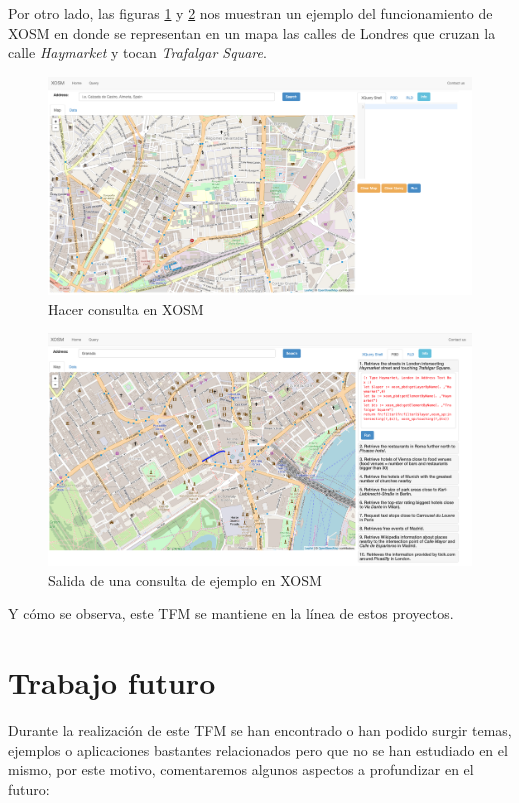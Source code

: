Por otro lado, las figuras \ref{fig:2-6} y \ref{fig:3-6} nos muestran un ejemplo del funcionamiento de XOSM en donde se representan en un mapa las calles de Londres que cruzan la calle \textit{Haymarket} y tocan \textit{Trafalgar Square}.

\begin{figure}[H]
	\centering
	\includegraphics[width=1\linewidth]{imagenes/capitulo6/2}
	\caption{Hacer consulta en XOSM}
	\label{fig:2-6}
\end{figure}

\begin{figure}[H]
	\centering
	\includegraphics[width=1\linewidth]{imagenes/capitulo6/3}
	\caption{Salida de una consulta de ejemplo en XOSM}
	\label{fig:3-6}
\end{figure}


Y cómo se observa, este TFM se mantiene en la línea de estos proyectos.

\section{Trabajo futuro}

Durante la realización de este TFM se han encontrado o han podido surgir temas, ejemplos o aplicaciones bastantes relacionados pero que no se han estudiado en el mismo, por este motivo, comentaremos algunos aspectos a profundizar en el futuro:


